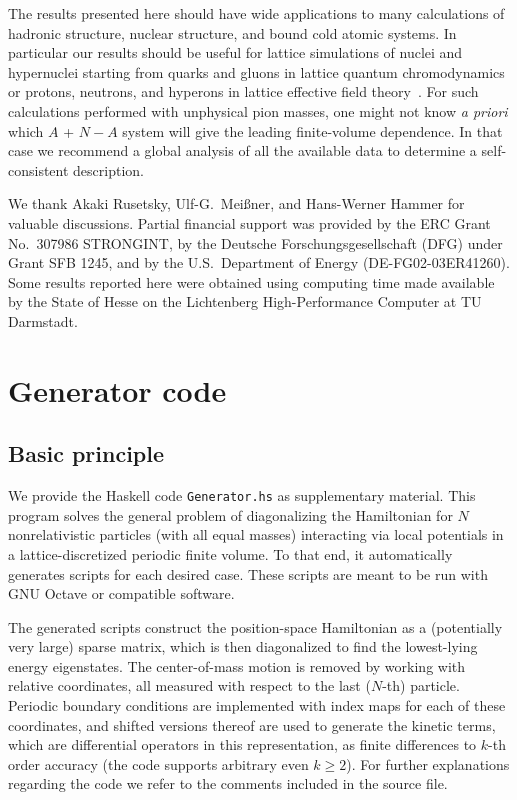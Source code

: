 \documentclass[aps,singlecolumn,superscriptaddress,nofootinbib,tightenlines,
preprintnumbers,showkeys]{revtex4-1}
\newcommand{\apriori}{\textit{a priori}\xspace}
\begin{document}
The results presented here should have wide applications to many 
calculations of hadronic structure, nuclear structure, and bound cold atomic 
systems.  In particular our results should be useful for lattice simulations of 
nuclei and hypernuclei starting from quarks and gluons in lattice quantum 
chromodynamics~\cite{Nicholson:2015pys,Berkowitz:2015eaa,Yamazaki:2015asa,
Yamazaki:2015vjn,Inoue:2014ipa,Etminan:2014tya,Beane:2014ora,Chang:2015qxa,
Savage:2016kon} or protons, neutrons, and hyperons in lattice effective field 
theory~\cite{Epelbaum:2013paa,Elhatisari:2015iga,Elhatisari:2016owd}.  For such
calculations performed with unphysical pion masses, one might not know \apriori 
which $A$ + $N{-}A$ system will give the leading finite-volume dependence.  In 
that case we recommend a global analysis of all the available data to determine 
a self-consistent description.

\begin{acknowledgments}
We thank Akaki Rusetsky, Ulf-G.~Meißner, and Hans-Werner Hammer for valuable
discussions.  Partial financial support was provided by the ERC Grant No.\ 
307986 STRONGINT, by the Deutsche Forschungsgesellschaft (DFG) under Grant SFB 
1245, and by the U.S.\ Department of Energy (DE-FG02-03ER41260).  Some
results reported here were obtained using computing time made available by the 
State of Hesse on the Lichtenberg High-Performance Computer at TU Darmstadt.
\end{acknowledgments}

\appendix

\section{Generator code}

\subsection{Basic principle}

We provide the Haskell code \texttt{Generator.hs} as supplementary material.  
This program solves the general problem of diagonalizing the Hamiltonian for $N$ 
nonrelativistic particles (with all equal masses) interacting via local 
potentials in a lattice-discretized periodic finite volume.  To that end, it 
automatically generates scripts for each desired case.  These scripts are meant 
to be run with GNU Octave or compatible software.

The generated scripts construct the position-space Hamiltonian as a 
(potentially very large) sparse matrix, which is then diagonalized to find the 
lowest-lying energy eigenstates.  The center-of-mass motion is removed by 
working with relative coordinates, all measured with respect to the last 
($N$-th) particle.  Periodic boundary conditions are implemented with index 
maps 
for each of these 
coordinates, and shifted versions thereof are used to generate the kinetic 
terms, which are differential operators in this representation, as finite 
differences to $k$-th order accuracy (the code supports arbitrary even 
$k\geq2$).  For further explanations regarding the code we refer to the 
comments 
included in the source file.
\end{document}
